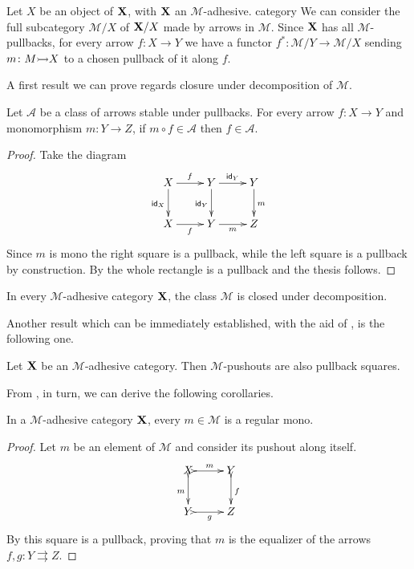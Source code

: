 \begin{remark}\label{rem:pb}
	Let $X$ be an object of $\textbf {\textup{X}}$, with $\textbf {\textup{X}}$ an $\mathcal{M}$-adhesive. category We can consider  the full subcategory $\mathcal{M}/X$ of $\textbf {\textup{X}}/X$ made by arrows in $\mathcal{M}$. Since $\textbf {\textup{X}}$ has all $\mathcal{M}$-pullbacks, for every arrow $f\colon X\to Y$ we have a functor $f^*\colon \mathcal{M}/Y\to \mathcal{M}/X $ sending $m\colon M \mto X$ to a chosen pullback of it along $f$.
	\end{remark}

A first result we can prove regards closure under decomposition of $\mathcal{M}$.

\begin{proposition}\label{prop:deco}Let  $\mathcal{A}$ be a class of arrows stable under pullbacks. For every arrow $f\colon X\to Y$ and monomorphism $m\colon Y\to Z$, if $m\circ f \in\mathcal{A}$ then $f\in \mathcal{A}$.
\end{proposition}
\begin{proof}Take the diagram
	\[\xymatrix{X \ar[d]_{\id{X}}\ar[r]^{f}& Y \ar[r]^{\id{Y}}  \ar[d]_{\id{Y}}& Y \ar[d]^{m}\\
		X \ar[r]_{f}& Y \ar[r]_{m} & Z}\]
	Since $m$ is mono the right square is a pullback, while the left square is a pullback by construction. By  the whole rectangle is a pullback and the thesis follows.
\end{proof}
\begin{corollary}\label{cor:deco}
	In every $\mathcal{M}$-adhesive category $\textbf {\textup{X}}$, the class $\mathcal{M}$ is closed under decomposition.
\end{corollary}

Another result which can be immediately established, with the aid of , is the following one.
\begin{proposition}\label{prop:pbpoad}
	Let $\textbf {\textup{X}}$ be an $\mathcal{M}$-adhesive category. Then $\mathcal{M}$-pushouts are also pullback squares.
\end{proposition}

From , in turn, we can derive the following corollaries.
\begin{corollary}\label{cor:rego}
	In a $\mathcal{M}$-adhesive category $\textbf {\textup{X}}$, every $m\in\mathcal{M}$ is a regular mono.
\end{corollary}
\begin{proof}
Let $m$ be an element of $\mathcal{M}$ and consider its pushout along itself.
\[\xymatrix{X\ar@{>->}[r]^m \ar@{>->}[d]_m& Y\ar@{>->}[d]^{f}\\Y \ar@{>->}[r]_g & Z}\]
By  this square is a pullback, proving that $m$ is the equalizer of the arrows $f,g\colon Y\rightrightarrows Z$. \qedhere 
\end{proof}

